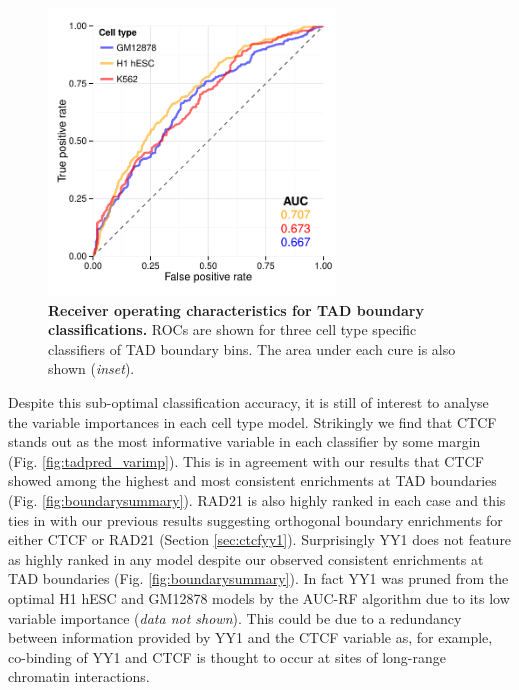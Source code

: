 \documentclass[a4paper,11pt,oneside]{book}
\begin{document}
\begin{figure}
\begin{center} 
\includegraphics[width=3in]{tadpred_auroc.pdf}
\captionsetup{width=\textwidth}
\caption[ Receiver operating characteristics for TAD boundary classifications. ]{ {\bf Receiver operating characteristics for TAD boundary classifications. }
ROCs are shown for three cell type specific classifiers of TAD boundary bins. The area under each cure is also shown (\emph{inset}).
}\label{fig:tadpred_auroc}
\end{center}
\end{figure} 

Despite this sub-optimal classification accuracy, it is still of interest to analyse the variable importances in each cell type model. Strikingly we find that CTCF stands out as the most informative variable in each classifier by some margin (Fig. \ref{fig:tadpred_varimp}). This is in agreement with our results that CTCF showed among the highest and most consistent enrichments at TAD boundaries (Fig. \ref{fig:boundarysummary}). RAD21 is also highly ranked in each case and this ties in with our previous results suggesting orthogonal boundary enrichments for either CTCF or RAD21 (Section \ref{sec:ctcfyy1}). Surprisingly YY1 does not feature as highly ranked in any model despite our observed consistent enrichments at TAD boundaries (Fig. \ref{fig:boundarysummary}). In fact YY1 was pruned from the optimal H1 hESC and GM12878 models by the AUC-RF algorithm due to its low variable importance (\emph{data not shown}). This could be due to a redundancy between information provided by YY1 and the CTCF variable as, for example, co-binding of YY1 and CTCF is thought to occur at sites of long-range chromatin interactions.\cite{Atchison2014} 
\end{document}
